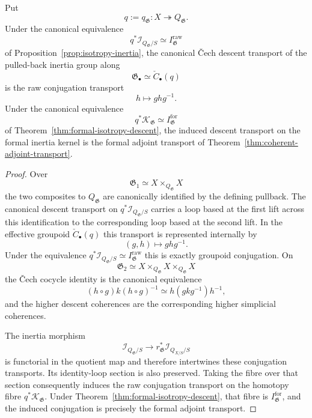 \begin{proposition}
\label{prop:inertia-descent-conjugation}
Put
\[
    q:=q_{\mathfrak G}:X\twoheadrightarrow Q_{\mathfrak G}.
\]
Under the canonical equivalence
\[
    q^*\mathcal I_{Q_{\mathfrak G}/S}
    \simeq
    I^{\mathrm{raw}}_{\mathfrak G}
\]
of Proposition~\ref{prop:isotropy-inertia}, the canonical \v{C}ech descent
transport of the pulled-back inertia group along
\[
    \mathfrak G_\bullet
    \simeq
    \check C_\bullet(q)
\]
is the raw conjugation transport
\[
    h\longmapsto ghg^{-1}.
\]
Under the canonical equivalence
\[
    q^*\mathcal K_{\mathfrak G}
    \simeq
    I^{\mathrm{for}}_{\mathfrak G}
\]
of Theorem~\ref{thm:formal-isotropy-descent}, the induced descent transport on
the formal inertia kernel is the formal adjoint transport of
Theorem~\ref{thm:coherent-adjoint-transport}.
\end{proposition}

\begin{proof}
Over
\[
    \mathfrak G_1
    \simeq
    X\times_{Q_{\mathfrak G}}X
\]
the two composites to $Q_{\mathfrak G}$ are canonically identified by the
defining pullback.  The canonical descent transport on
$q^*\mathcal I_{Q_{\mathfrak G}/S}$ carries a loop based at the first lift
across this identification to the corresponding loop based at the second
lift.  In the effective groupoid
$\check C_\bullet(q)$ this transport is represented internally by
\[
    (g,h)\longmapsto ghg^{-1}.
\]
Under the equivalence
$q^*\mathcal I_{Q_{\mathfrak G}/S}\simeq
I^{\mathrm{raw}}_{\mathfrak G}$ this is exactly groupoid conjugation.
On
\[
    \mathfrak G_2
    \simeq
    X\times_{Q_{\mathfrak G}}X\times_{Q_{\mathfrak G}}X
\]
the \v{C}ech cocycle identity is the canonical equivalence
\[
    (h\circ g)k(h\circ g)^{-1}
    \simeq
    h(gkg^{-1})h^{-1},
\]
and the higher descent coherences are the corresponding higher simplicial
coherences.

The inertia morphism
\[
    \mathcal I_{Q_{\mathfrak G}/S}
    \longrightarrow
    r_{\mathfrak G}^*
    \mathcal I_{Q_{X/S}/S}
\]
is functorial in the quotient map and therefore intertwines these conjugation
transports.  Its identity-loop section is also preserved.  Taking the fibre
over that section consequently induces the raw conjugation transport on the
homotopy fibre $q^*\mathcal K_{\mathfrak G}$.  Under
Theorem~\ref{thm:formal-isotropy-descent}, that fibre is
$I^{\mathrm{for}}_{\mathfrak G}$, and the induced conjugation is precisely
the formal adjoint transport.
\end{proof}

